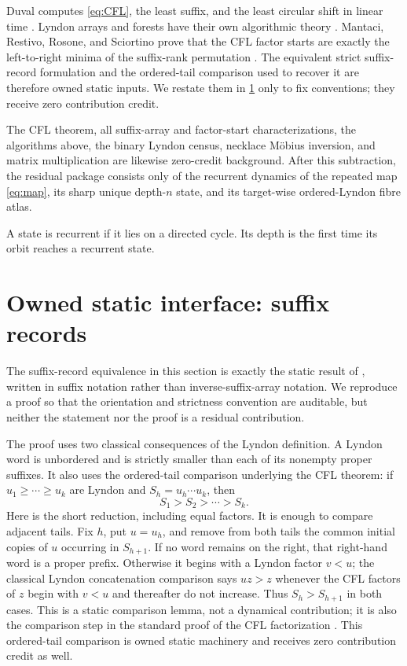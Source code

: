 \documentclass[10pt,a4paper]{amsart}
\theoremstyle{definition}
\theoremstyle{remark}
\begin{document}
Duval computes \eqref{eq:CFL}, the least suffix, and the least circular shift
in linear time \cite{Duval1983}.  Lyndon arrays and forests have their own
algorithmic theory \cite{FranekIslamRahmanSmyth2016,BadkobehCrochemore2022}.
Mantaci, Restivo, Rosone, and Sciortino prove that the CFL factor starts are
exactly the left-to-right minima of the suffix-rank permutation
\cite[Theorem~2.2]{MantaciRestivoRosoneSciortino2014}.  The equivalent strict
suffix-record formulation and the ordered-tail comparison used to recover it
are therefore owned static inputs.  We restate them in \cref{sec:owned} only
to fix conventions; they receive zero contribution credit.

The CFL theorem, all suffix-array and factor-start characterizations, the
algorithms above, the binary Lyndon census, necklace M\"obius inversion, and
matrix multiplication are likewise zero-credit background.  After this
subtraction, the residual package consists only of the recurrent dynamics of
the repeated map \eqref{eq:map}, its sharp unique depth-$n$ state, and its
target-wise ordered-Lyndon fibre atlas.

A state is recurrent if it lies on a directed cycle.  Its depth is the first
time its orbit reaches a recurrent state.

\section{Owned static interface: suffix records}\label{sec:owned}

The suffix-record equivalence in this section is exactly the static result of
\citet[Theorem~2.2]{MantaciRestivoRosoneSciortino2014}, written in suffix
notation rather than inverse-suffix-array notation.  We reproduce a proof so
that the orientation and strictness convention are auditable, but neither the
statement nor the proof is a residual contribution.

The proof uses two classical consequences of the Lyndon definition.  A Lyndon
word is unbordered and is strictly smaller than each of its nonempty proper
suffixes.  It also uses the ordered-tail comparison underlying the CFL
theorem: if
$u_1\ge\cdots\ge u_k$ are Lyndon and
$S_h=u_h\cdots u_k$, then
\begin{equation}\label{eq:taildescent}
 S_1>S_2>\cdots>S_k.
\end{equation}
Here is the short reduction, including equal factors.  It is enough to
compare adjacent tails.  Fix $h$, put $u=u_h$, and remove from both tails the
common initial copies of $u$ occurring in $S_{h+1}$.  If no word remains on
the right, that right-hand word is a proper prefix.  Otherwise it begins with
a Lyndon factor $v<u$; the classical Lyndon concatenation comparison says
$uz>z$ whenever the CFL factors of $z$ begin with $v<u$ and thereafter do
not increase.  Thus $S_h>S_{h+1}$ in both cases.  This is a static comparison
lemma, not a dynamical contribution; it is also the comparison step in the
standard proof of the CFL factorization \cite{ChenFoxLyndon1958,Duval1983}.
This ordered-tail comparison is owned static machinery and receives zero
contribution credit as well.
\end{document}
